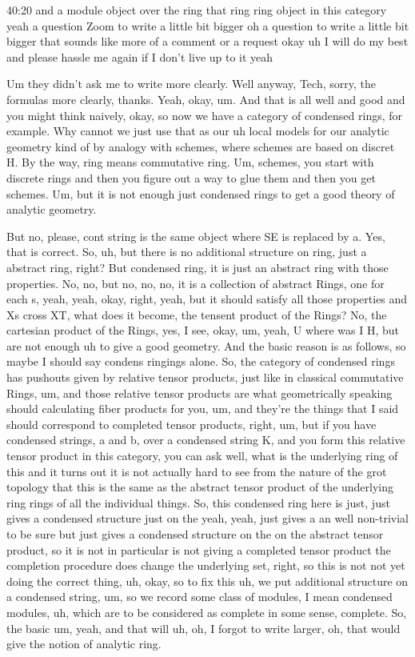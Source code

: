 \begin{unfinished}{40:20}
 and a module object over the ring that ring ring object in this category yeah a question Zoom to write a little bit bigger oh a question to write a little bit bigger that sounds like more of a comment or a request okay uh I will do my best and please hassle me again if I don't live up to it yeah

Um they didn't ask me to write more clearly. Well anyway, Tech, sorry, the formulas more clearly, thanks. Yeah, okay, um. And that is all well and good and you might think naively, okay, so now we have a category of condensed rings, for example. Why cannot we just use that as our uh local models for our analytic geometry kind of by analogy with schemes, where schemes are based on discret H. By the way, ring means commutative ring. Um, schemes, you start with discrete rings and then you figure out a way to glue them and then you get schemes. Um, but it is not enough just condensed rings to get a good theory of analytic geometry.

But no, please, cont string is the same object where SE is replaced by a. Yes, that is correct. So, uh, but there is no additional structure on ring, just a abstract ring, right? But condensed ring, it is just an abstract ring with those properties. No, no, but no, no, no, it is a collection of abstract Rings, one for each s, yeah, yeah, okay, right, yeah, but it should satisfy all those properties and Xs cross XT, what does it become, the tensent product of the Rings? No, the cartesian product of the Rings, yes, I see, okay, um, yeah, U where was I H, but are not enough uh to give a good geometry. And the basic reason is as follows, so maybe I should say condens ringings alone. So, the category of condensed rings has pushouts given by relative tensor products, just like in classical commutative Rings, um, and those relative tensor products are what geometrically speaking should calculating fiber products for you, um, and they're the things that I said should correspond to completed tensor products, right, um, but if you have condensed strings, a and b, over a condensed string K, and you form this relative tensor product in this category, you can ask well, what is the underlying ring of this and it turns out it is not actually hard to see from the nature of the grot topology that this is the same as the abstract tensor product of the underlying ring rings of all the individual things. So, this condensed ring here is just, just gives a condensed structure just on the yeah, yeah, just gives a an well non-trivial to be sure but just gives a condensed structure on the on the abstract tensor product, so it is not in particular is not giving a completed tensor product the completion procedure does change the underlying set, right, so this is not not yet doing the correct thing, uh, okay, so to fix this uh, we put additional structure on a condensed string, um, so we record some class of modules, I mean condensed modules, uh, which are to be considered as complete in some sense, complete. So, the basic um, yeah, and that will uh, oh, I forgot to write larger, oh, that would give the notion of analytic ring.


\end{unfinished}
